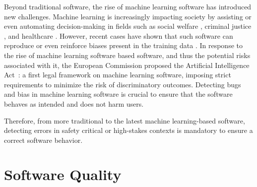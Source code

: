 Beyond traditional software, the rise of machine learning software has introduced new challenges.
Machine learning is increasingly impacting society by assisting or even automating decision-making in fields such as social welfare , criminal justice , and healthcare .
However, recent cases have shown that such software can reproduce or even reinforce biases present in the training data \cite{Buolamwini2018,Kay2015,Larson2016,Obermeyer2019}.
In response to the rise of machine learning software based software, and thus the potential risks associated with it, the European Commission proposed the Artificial Intelligence Act~: a first legal framework on machine learning software, imposing strict requirements to minimize the risk of discriminatory outcomes.
Detecting bugs and bias in machine learning software is crucial to ensure that the software behaves as intended and does not harm users.



Therefore, from more traditional to the latest machine learning-based software, detecting errors in safety critical or high-stakes contexts is mandatory to ensure a correct software behavior.

\section{Software Quality}


